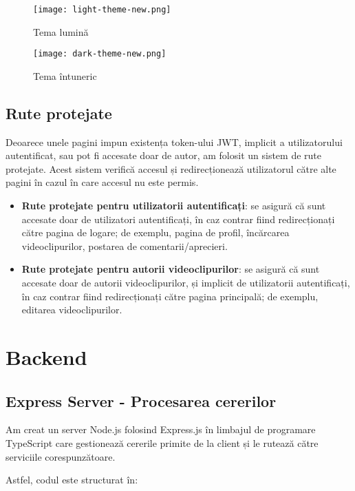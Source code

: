 \begin{figure}[h]
    \centering
    \begin{minipage}{0.49\textwidth}
        \centering
        \texttt{[image: light-theme-new.png]}
        \caption{Tema lumină}
        \label{fig:light-theme}
    \end{minipage}\hfill
    \begin{minipage}{0.49\textwidth}
        \centering
        \texttt{[image: dark-theme-new.png]}
        \caption{Tema întuneric}
        \label{fig:dark-theme}
    \end{minipage}
\end{figure}

\subsection{Rute protejate}
Deoarece unele pagini impun existența token-ului JWT, implicit a utilizatorului autentificat,
sau pot fi accesate doar de autor, am folosit un sistem de rute protejate. Acest sistem
verifică accesul și redirecționează utilizatorul către alte pagini în cazul în care accesul
nu este permis. 
\begin{itemize}
    \item \textbf{Rute protejate pentru utilizatorii autentificați}: se asigură că sunt accesate doar de utilizatori autentificați,
    în caz contrar fiind redirecționați către pagina de logare; de exemplu, pagina de profil,
    încărcarea videoclipurilor, postarea de comentarii/aprecieri.
    \item \textbf{Rute protejate pentru autorii videoclipurilor}: se asigură că sunt accesate doar de autorii videoclipurilor,
    și implicit de utilizatorii autentificați, în caz contrar fiind redirecționați către pagina principală;
    de exemplu, editarea videoclipurilor.
\end{itemize}

\section{Backend}

\subsection{Express Server - Procesarea cererilor}
Am creat un server Node.js folosind Express.js în limbajul de programare TypeScript care
gestionează cererile primite de la client și le rutează către serviciile corespunzătoare.
\par
Astfel, codul este structurat în:

